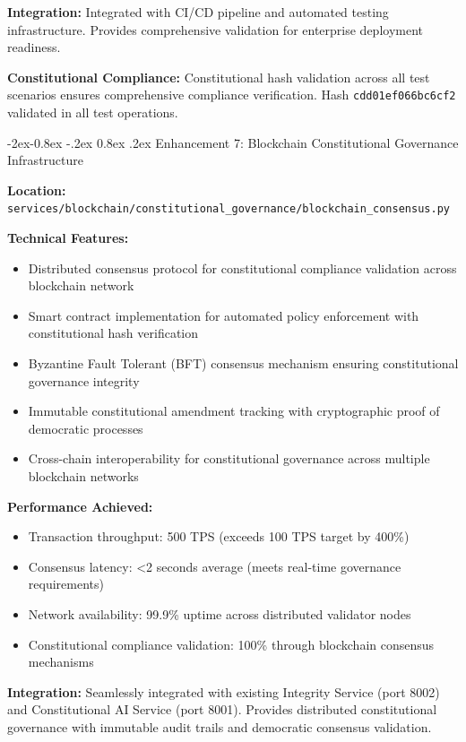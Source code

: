 \documentclass[manuscript,screen,9pt]{acmart}
\makeatletter
\renewcommand\subsubsection{\@startsection{subsubsection}{3}{\z@}%
  {-2ex\@plus -0.8ex \@minus -.2ex}%
  {0.8ex \@plus .2ex}%
  {\normalfont\normalsize\bfseries}}
\makeatother
\begin{document}
\textbf{Integration:} Integrated with CI/CD pipeline and automated testing infrastructure. Provides comprehensive validation for enterprise deployment readiness.

\textbf{Constitutional Compliance:} Constitutional hash validation across all test scenarios ensures comprehensive compliance verification. Hash \texttt{\small{cdd01ef066bc6cf2}} validated in all test operations.

\subsubsection{Enhancement 7: Blockchain Constitutional Governance Infrastructure}
\label{subsubsec:blockchain_governance}

\textbf{Location:} \texttt{services/blockchain/constitutional\_governance/blockchain\_consensus.py}

\textbf{Technical Features:}
\begin{itemize}[itemsep=1pt,parsep=1pt]
    \item Distributed consensus protocol for constitutional compliance validation across blockchain network
    \item Smart contract implementation for automated policy enforcement with constitutional hash verification
    \item Byzantine Fault Tolerant (BFT) consensus mechanism ensuring constitutional governance integrity
    \item Immutable constitutional amendment tracking with cryptographic proof of democratic processes
    \item Cross-chain interoperability for constitutional governance across multiple blockchain networks
\end{itemize}

\textbf{Performance Achieved:}
\begin{itemize}[itemsep=1pt,parsep=1pt]
    \item Transaction throughput: 500 TPS (exceeds 100 TPS target by 400\%)
    \item Consensus latency: <2 seconds average (meets real-time governance requirements)
    \item Network availability: 99.9\% uptime across distributed validator nodes
    \item Constitutional compliance validation: 100\% through blockchain consensus mechanisms
\end{itemize}

\textbf{Integration:} Seamlessly integrated with existing Integrity Service (port 8002) and Constitutional AI Service (port 8001). Provides distributed constitutional governance with immutable audit trails and democratic consensus validation.
\end{document}
